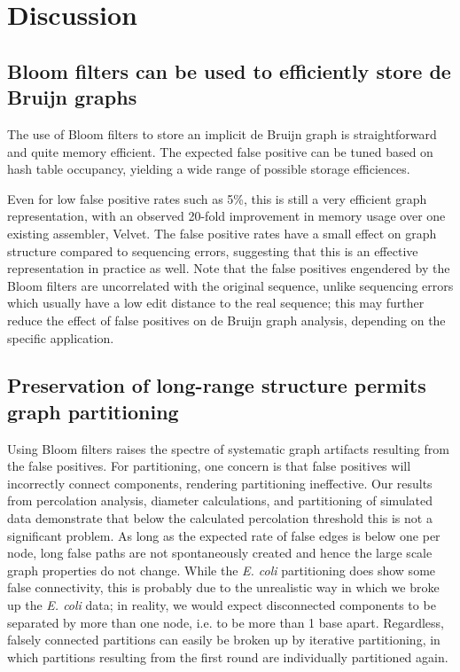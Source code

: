 \documentclass[12pt]{article} \usepackage{simplemargins}
\begin{document}
\section{Discussion}

\subsection{Bloom filters can be used to efficiently store de Bruijn graphs}


The use of Bloom filters to store an implicit de Bruijn graph is
straightforward and quite memory efficient.  The expected false
positive can be tuned based on hash table occupancy, yielding a wide
range of possible storage efficiences.

Even for low false positive rates such as 5\%, this is still a very
efficient graph representation, with an observed 20-fold improvement
in memory usage over one existing assembler, Velvet.  The false
positive rates have a small effect on graph structure compared to
sequencing errors, suggesting that this is an effective representation
in practice as well.  Note that the false positives engendered by the
Bloom filters are uncorrelated with the original sequence, unlike
sequencing errors which usually have a low edit distance to the
real sequence; this may further reduce the effect of false positives
on de Bruijn graph analysis, depending on the specific application.

\subsection{Preservation of long-range structure permits graph partitioning}

Using Bloom filters raises the spectre of systematic graph artifacts
resulting from the false positives.  For partitioning, one concern is
that false positives will incorrectly connect components, rendering
partitioning ineffective.  Our results from percolation analysis,
diameter calculations, and partitioning of simulated data demonstrate
that below the calculated percolation threshold this is not a
significant problem.  As long as the expected rate of false edges is
below one per node, long false paths are not spontaneously created and
hence the large scale graph properties do not change.  While the \emph{E. coli} partitioning
does show some false connectivity, this is probably due to the
unrealistic way in which we broke up the \emph{E. coli} data; in reality, we
would expect disconnected components to be separated by more than one
node, i.e. to be more than 1 base apart.  Regardless, falsely connected partitions can easily be broken
up by iterative partitioning, in which partitions resulting from the
first round are individually partitioned again.
\end{document}
